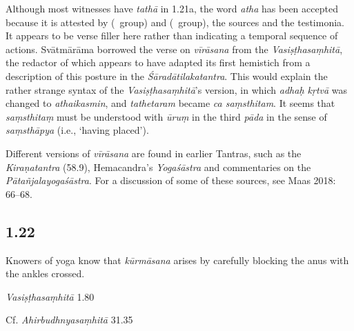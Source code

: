 \begin{ekdosis}
\begin{philcomm}[hp01_021]   
Although most witnesses have \emph{tathā} in 1.21a, the word \emph{atha} has been accepted because it is attested by  (\textalpha\ group) and  (\texteta\ group), the sources and the testimonia. It appears to be verse filler here rather than indicating a temporal sequence of actions. Svātmārāma borrowed the verse on \emph{vīrāsana} from the \emph{Vasiṣṭhasaṃhitā}, the redactor of which appears to have adapted its first hemistich from a description of this posture in the \emph{Śāradātilakatantra}. This would explain the rather strange syntax of the \emph{Vasiṣṭhasaṃhitā}’s version, in which \emph{adhaḥ kṛtvā} was changed to \emph{athaikasmin}, and \emph{tathetaram} became \emph{ca saṃsthitam}. It seems that \emph{saṃsthitaṃ} must be understood with \emph{ūruṃ} in the third \emph{pāda} in the sense of \emph{saṃsthāpya} (i.e., ‘having placed’).

Different versions of \emph{vīrāsana} are found in earlier Tantras, such as the \emph{Kiraṇatantra} (58.9), Hemacandra’s \emph{Yogaśāstra} and commentaries on the \emph{Pātañjalayogaśāstra}. For a discussion of some of these sources, see Maas 2018: 66–68.
\end{philcomm}

\subsection*{1.22}
\begin{translation}[hp01_022]
Knowers of yoga know that \emph{kūrmāsana} arises by carefully blocking the anus with the ankles crossed.%
\end{translation}

\begin{sources}[hp01_022]
\emph{Vasiṣṭhasaṃhitā} 1.80

\begin{versinnote}
\end{versinnote}

Cf. \emph{Ahirbudhnyasaṃhitā} 31.35

\begin{versinnote}
\end{versinnote}


\end{sources}
\end{ekdosis}
